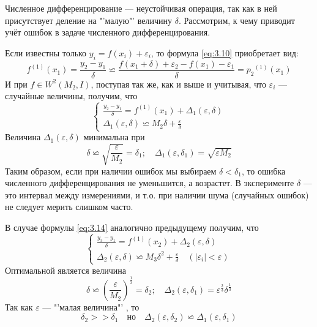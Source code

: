 Численное дифференцирование --- неустойчивая операция, так как в ней присутствует деление на "'малую"' величину $\delta$. Рассмотрим, к чему приводит учёт ошибок в задаче численного дифференцирования.

Если известны только $y_i = f(x_i) + \varepsilon_i$, то формула \ref{eq:3.10} приобретает вид:
\begin{dmath}
	f^{(1)}(x_1) = \frac{y_2 - y_1}{\delta} \backsimeq \frac{f(x_1 + \delta) + \varepsilon_2 - f(x_1) - \varepsilon_1}{\delta} = {p_2}^{(1)}(x_1)
\end{dmath}
И при $f \in W^2(M_2, I)$, поступая так же, как и выше и учитывая, что $\varepsilon_i$ --- случайные величины, получим, что
\begin{dmath}
	\begin{cases}
		\frac{y_2 - y_1}{\delta} = f^{(1)}(x_1) + \Delta_1(\varepsilon, \delta) \\
		\Delta_1(\varepsilon, \delta) \backsimeq M_2\delta + \frac{\varepsilon}{\delta}
	\end{cases}
\end{dmath}
Величина $\Delta_1(\varepsilon, \delta)$ минимальна при
\begin{equation}
	\delta \backsimeq \sqrt{\frac{\varepsilon}{M_2}} = \delta_1; \quad \Delta_1(\varepsilon, \delta_1) = \sqrt{\varepsilon M_2}
\end{equation}
Таким образом, если при наличии ошибок мы выбираем $\delta<\delta_1$, то ошибка численного дифференцирования не уменьшится, а возрастет. В эксперименте $\delta$ --- это интервал между измерениями, и т.о. при наличии шума (случайных ошибок) не следует мерить слишком часто.

В случае формулы \ref{eq:3.14} аналогично предыдущему получим, что
\begin{dmath}
	\begin{cases}
		\frac{y_3 - y_1}{\delta} = f^{(1)}(x_2) + \Delta_2(\varepsilon, \delta) \\ 
		\Delta_2(\varepsilon, \delta) \backsimeq M_3\delta^2 + \frac{\varepsilon}{\delta} \quad (|\varepsilon_i|<\varepsilon)
	\end{cases}
\end{dmath}
Оптимальной является величина
\begin{equation}
	\delta \backsimeq {(\frac{\varepsilon}{M_2})}^{\frac{1}{3}} = \delta_2; \quad \Delta_2(\varepsilon, \delta_1) = \varepsilon^{\frac{2}{3}} \delta^{\frac{1}{3}}
\end{equation}
Так как $\varepsilon$ --- "'малая величина"' , то 
\begin{equation}
	\delta_2 >> \delta_1 \quad но \quad \Delta_2(\varepsilon, \delta_2) \backsimeq \Delta_1(\varepsilon, \delta_1)
\end{equation}

